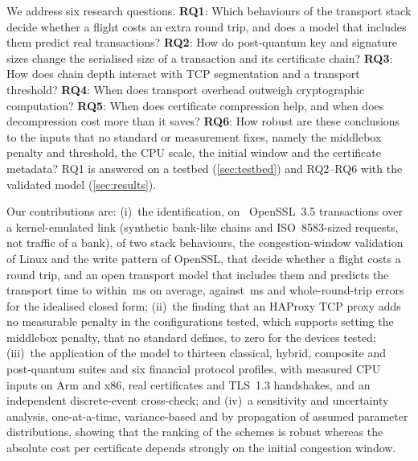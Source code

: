 \documentclass[preprint,12pt]{elsarticle}
\newcommand{\ms}{\,ms\xspace}
\begin{document}
We address six research questions. \textbf{RQ1}: Which behaviours of the transport stack decide whether a flight costs an extra round trip, and does a model that includes them predict real transactions? \textbf{RQ2}: How do post-quantum key and signature sizes change the serialised size of a transaction and its certificate chain? \textbf{RQ3}: How does chain depth interact with TCP segmentation and a transport threshold? \textbf{RQ4}: When does transport overhead outweigh cryptographic computation? \textbf{RQ5}: When does certificate compression help, and when does decompression cost more than it saves? \textbf{RQ6}: How robust are these conclusions to the inputs that no standard or measurement fixes, namely the middlebox penalty and threshold, the CPU scale, the initial window and the certificate metadata? RQ1 is answered on a testbed (\cref{sec:testbed}) and RQ2--RQ6 with the validated model (\cref{sec:results}).

Our contributions are: (i)~the identification, on \tbNTrans\ OpenSSL~3.5 transactions over a kernel-emulated link (synthetic bank-like chains and ISO~8583-sized requests, not traffic of a bank), of two stack behaviours, the congestion-window validation of Linux and the write pattern of OpenSSL, that decide whether a flight costs a round trip, and an open transport model that includes them and predicts the transport time to within \tbMaeStack\ms on average, against \tbMaeIdeal\ms and whole-round-trip errors for the idealised closed form; (ii)~the finding that an HAProxy TCP proxy adds no measurable penalty in the configurations tested, which supports setting the middlebox penalty, that no standard defines, to zero for the devices tested; (iii)~the application of the model to thirteen classical, hybrid, composite and post-quantum suites and six financial protocol profiles, with measured CPU inputs on Arm and x86, real certificates and TLS~1.3 handshakes, and an independent discrete-event cross-check; and (iv)~a sensitivity and uncertainty analysis, one-at-a-time, variance-based and by propagation of assumed parameter distributions, showing that the ranking of the schemes is robust whereas the absolute cost per certificate depends strongly on the initial congestion window.
\end{document}
